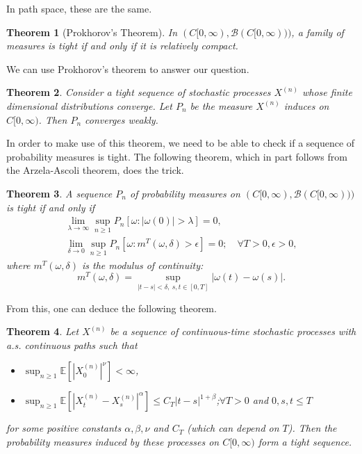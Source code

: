 \documentclass[11pt,letterpaper]{article}
\newcommand{\mcal}[1]{\mathcal{#1}}
\newcommand{\E}{\mathbb{E}}
\theoremstyle{plain}
\newtheorem{theorem}{Theorem}[section] %
\theoremstyle{definition}
\begin{document}
\noindent In path space, these are the same.

\begin{theorem}[Prokhorov's Theorem]
	In $(C[0, \infty), \mcal{B}(C[0, \infty)))$, a family of measures is tight if and only if it is relatively compact.
\end{theorem}

\noindent We can use Prokhorov's theorem to answer our question.

\begin{theorem}
	Consider a tight sequence of stochastic processes $X^{(n)}$ whose finite dimensional distributions converge. Let $P_n$ be the measure $X^{(n)}$ induces on $C[0, \infty)$. Then $P_n$ converges weakly.
\end{theorem}

\noindent In order to make use of this theorem, we need to be able to check if a sequence of probability measures is tight. The following theorem, which in part follows from the Arzela-Ascoli theorem, does the trick.

\begin{theorem}
	A sequence $P_n$ of probability measures on $(C[0, \infty), \mcal{B}(C[0, \infty)))$ is tight if and only if
	\begin{gather*}
		\lim_{\lambda\to \infty}\sup_{n\geq 1}P_n[\omega: |\omega(0)|>\lambda] = 0,\\
		\lim_{\delta\to 0}\sup_{n\geq 1} P_n[\omega: m^T(\omega, \delta)>\epsilon] = 0;\quad \forall T>0, \epsilon>0,
	\end{gather*}
	where $m^T(\omega, \delta)$ is the modulus of continuity:
	\[
	m^T(\omega, \delta) = \sup_{|t-s|<\delta,\ s,t\in [0,T]}|\omega(t)-\omega(s)|.
	\]
\end{theorem}

\noindent From this, one can deduce the following theorem.

\begin{theorem}
	Let $X^{(n)}$ be a sequence of continuous-time stochastic processes with a.s. continuous paths such that
	\begin{itemize}
		\item $\sup_{n\geq 1} \E[|X_0^{(n)}|^\nu] < \infty$,
		\item $\sup_{n\geq 1}\E[|X_t^{(n)} - X_s^{(n)}|^\alpha]\leq C_T|t-s|^{1+\beta}$;\quad $\forall T>0$ and $0,s,t\leq T$
	\end{itemize}
	for some positive constants $\alpha, \beta, \nu$ and $C_T$ (which can depend on $T$). Then the probability measures induced by these processes on $C[0, \infty)$ form a tight sequence.
\end{theorem}
\end{document}
